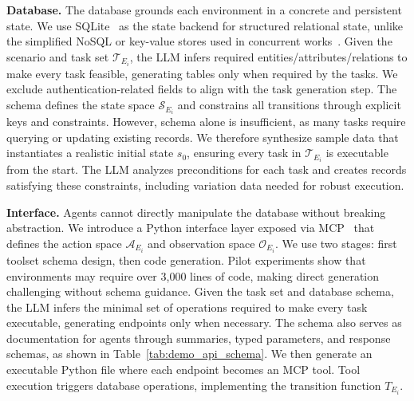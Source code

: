 \documentclass{article}
\theoremstyle{plain}
\theoremstyle{definition}
\theoremstyle{remark}
\newcommand{\myparagraph}[1]{\noindent\textbf{#1}}
\begin{document}
\myparagraph{Database.} \label{sec:database_synthesis}
The database grounds each environment in a concrete and persistent state.
We use SQLite~\citep{sqlite} as the state backend for structured relational state, unlike the simplified NoSQL or key-value stores used in concurrent works~\citep{autoenv,autoforge,envscaler}.
Given the scenario and task set $\mathcal{T}_{E_i}$, the LLM infers required entities/attributes/relations to make every task feasible, generating tables only when required by the tasks.
We exclude authentication-related fields to align with the task generation step.
The schema defines the state space $\mathcal{S}_{E_i}$ and constrains all transitions through explicit keys and constraints.
However, schema alone is insufficient, as many tasks require querying or updating existing records.
We therefore synthesize sample data that instantiates a realistic initial state $s_0$, ensuring every task in $\mathcal{T}_{E_i}$ is executable from the start.
The LLM analyzes preconditions for each task and creates records satisfying these constraints, including variation data needed for robust execution.

\myparagraph{Interface.} \label{sec:env_synthesis}
Agents cannot directly manipulate the database without breaking abstraction.
We introduce a Python interface layer exposed via MCP~\citep{anthropic_mcp_2024} that defines the action space $\mathcal{A}_{E_i}$ and observation space $\mathcal{O}_{E_i}$.
We use two stages: first toolset schema design, then code generation.
Pilot experiments show that environments may require over 3,000 lines of code, making direct generation challenging without schema guidance.
Given the task set and database schema, the LLM infers the minimal set of operations required to make every task executable, generating endpoints only when necessary.
The schema also serves as documentation for agents through summaries, typed parameters, and response schemas, as shown in Table~\ref{tab:demo_api_schema}.
We then generate an executable Python file where each endpoint becomes an MCP tool.
Tool execution triggers database operations, implementing the transition function $T_{E_i}$.
\end{document}
